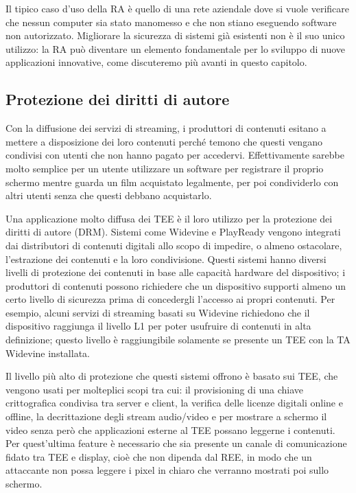 \documentclass[12pt,italian]{report}
\begin{document}
Il tipico caso d'uso della RA è quello di una rete aziendale dove si
vuole verificare che nessun computer sia stato manomesso
e che non stiano eseguendo software non autorizzato.
Migliorare la sicurezza di sistemi già esistenti non è il suo unico utilizzo:
la RA può diventare un elemento fondamentale per lo sviluppo di nuove
applicazioni innovative, come discuteremo più avanti in questo capitolo.

\subsection{Protezione dei diritti di autore}
\label{subsec:drm}
Con la diffusione dei servizi di streaming, i produttori di contenuti esitano
a mettere a disposizione dei loro contenuti perché temono che questi vengano
condivisi con utenti che non hanno pagato per accedervi.
Effettivamente sarebbe molto semplice per un utente utilizzare un software per
registrare il proprio schermo mentre guarda un film acquistato legalmente, per
poi condividerlo con altri utenti senza che questi debbano acquistarlo.

Una applicazione molto diffusa dei TEE è il loro utilizzo per la protezione
dei diritti di autore (DRM). 
Sistemi come Widevine\cite{widevine} e PlayReady\cite{playready} vengono
integrati dai distributori di contenuti digitali allo scopo di impedire, o
almeno ostacolare, l'estrazione dei contenuti e la loro condivisione.
Questi sistemi hanno diversi livelli di protezione dei contenuti in base alle
capacità hardware del dispositivo; i produttori di contenuti possono richiedere
che un dispositivo supporti almeno un certo livello di sicurezza prima di
concedergli l'accesso ai propri contenuti.
Per esempio, alcuni servizi di streaming basati su Widevine richiedono che il
dispositivo raggiunga il livello L1 per poter usufruire di contenuti in alta
definizione; questo livello è raggiungibile solamente se presente un TEE con
la TA Widevine installata.

Il livello più alto di protezione che questi sistemi offrono è basato sui TEE,
che vengono usati per molteplici scopi tra cui: il provisioning di una chiave
crittografica condivisa tra server e client, la verifica delle licenze digitali
online e offline, la decrittazione degli stream audio/video e per mostrare
a schermo il video senza però che applicazioni esterne al TEE possano leggerne
i contenuti.
Per quest'ultima feature è necessario che sia presente un canale di
comunicazione fidato tra TEE e display, cioè che non dipenda dal REE, in modo
che un attaccante non possa leggere i pixel in chiaro che verranno mostrati poi
sullo schermo.
\end{document}

